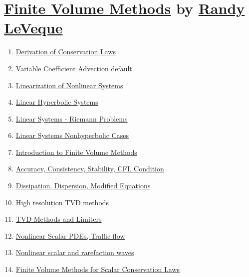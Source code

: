 \documentclass[11pt]{article}
\begin{document}
\newpage 

\section[Finite Volume Methods]{{\large \href{https://faculty.washington.edu/rjl/classes/am574w2023/}{Finite Volume Methods}} by {\large \href{https://amath.washington.edu/people/randy-leveque}{Randy LeVeque}}}

\vspace{-0.5cm}

\begin{enumerate}
	\item \href{https://mp.weixin.qq.com/s/4GLJvMPV8FCq_jUI0WE4bw}{Derivation of Conservation Laws}	%
	\item \href{https://mp.weixin.qq.com/s/XEijXbgnhP0FBhnhE1KJIQ}{Variable Coefficient Advection default}	%
	\item \href{https://mp.weixin.qq.com/s/sm4sgWfx0kGUD05r1Ot1MA}{Linearization of Nonlinear Systems}	%
	\item \href{https://mp.weixin.qq.com/s/lNjwuU41J_DagQSlHohVcw}{Linear Hyperbolic Systems}	%
	\item \href{https://mp.weixin.qq.com/s/bthCrLbGabbSXZLWYsInLQ}{Linear Systems - Riemann Problems}	%
	\item \href{https://mp.weixin.qq.com/s/x_nEO6Kq_A1ymAQAgCr2AQ}{Linear Systems Nonhyperbolic Cases}	%
	\item \href{https://mp.weixin.qq.com/s/0j1fEMZu-9a8ATWkpvYI1A}{Introduction to Finite Volume Methods}	%
	\item \href{https://mp.weixin.qq.com/s/T4EC8Ad4mi5sLZkEpz-IhA}{Accuracy, Consistency, Stability, CFL Condition}	%
	\item \href{https://mp.weixin.qq.com/s/bnZTFxqizNQyrG6xFTouvw}{Dissipation, Dispersion, Modified Equations}	%
	\item \href{https://mp.weixin.qq.com/s/CyZzcLhrfiLadluHfomccQ}{High resolution TVD methods}	%
	\item \href{https://mp.weixin.qq.com/s/V13b46YKR6T3sA-TSZ4wUw}{TVD Methods and Limiters}	%
	\item \href{https://mp.weixin.qq.com/s/vtnG4_av60ZuSM_EKMzvcg}{Nonlinear Scalar PDEs, Traffic flow}	%
	\item \href{https://mp.weixin.qq.com/s/WfZd_-7G9UF7-BY1w9Vi1Q}{Nonlinear scalar and rarefaction waves}	%
	\item \href{https://mp.weixin.qq.com/s/BpLLVds39fX4wIb8EExwgg}{Finite Volume Methods for Scalar Conservation Laws}	%

\end{enumerate}
\end{document}
